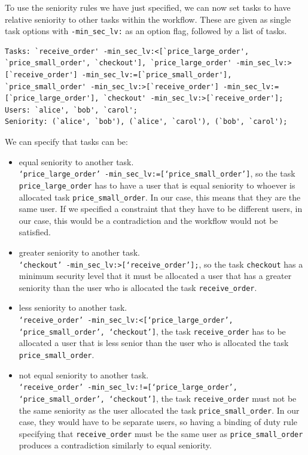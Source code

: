 \documentclass[a4paper]{report}
\begin{document}
To use the seniority rules we have just specified, we can now set tasks to have relative seniority to other tasks within the workflow. These are given as single task options with \texttt{-min\_sec\_lv:} as an option flag, followed by a list of tasks.
\begin{lstlisting}[frame=single]
Tasks: `receive_order' -min_sec_lv:<[`price_large_order', `price_small_order', `checkout'], `price_large_order' -min_sec_lv:>[`receive_order'] -min_sec_lv:=[`price_small_order'], `price_small_order' -min_sec_lv:>[`receive_order'] -min_sec_lv:=[`price_large_order'], `checkout' -min_sec_lv:>[`receive_order']; 
Users: `alice', `bob', `carol'; 
Seniority: (`alice', `bob'), (`alice', `carol'), (`bob', `carol');
\end{lstlisting} 
We can specify that tasks can be:
\begin{itemize}
\item equal seniority to another task. \\
\texttt{`price\_large\_order' -min\_sec\_lv:=[`price\_small\_order']}, so the task \texttt{price\_large\_order} has to have a user that is equal seniority to whoever is allocated task \texttt{price\_small\_order}. In our case, this means that they are the same user. If we specified a constraint that they have to be different users, in our case, this would be a contradiction and the workflow would not be satisfied.
\item greater seniority to another task.\\ 
\texttt{`checkout' -min\_sec\_lv:>[`receive\_order'];}, so the task \texttt{checkout} has a minimum security level that it must be allocated a user that has a greater seniority than the user who is allocated the task \texttt{receive\_order}.
\item less seniority to another task.\\
\texttt{`receive\_order' -min\_sec\_lv:<[`price\_large\_order', `price\_small\_order', `checkout']}, the task \texttt{receive\_order} has to be allocated a user that is less senior than the user who is allocated the task \texttt{price\_small\_order}.
\item not equal seniority to another task.\\
\texttt{`receive\_order' -min\_sec\_lv:!=[`price\_large\_order', `price\_small\_order', `checkout']}, the task \texttt{receive\_order} must not be the same seniority as the user allocated the task \texttt{price\_small\_order}. In our case, they would have to be separate users, so having a binding of duty rule specifying that \texttt{receive\_order} must be the same user as \texttt{price\_small\_order} produces a contradiction similarly to equal seniority.
\end{itemize}
\end{document}
